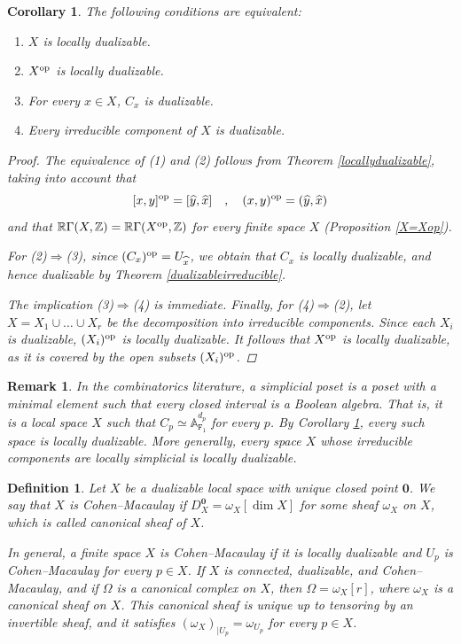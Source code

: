\documentclass[amssymb,amscd,11pt,20pt]{amsart}
\newcommand{\FF}{{\mathtt F}}
\newcommand{\ZZ}{{\mathbb Z}}
\newcommand{\RR}{\mathbb R}
\newcommand{\0}{\mathbf 0}
\newcommand{\wh}{\widehat}
\newcommand{\A}{{\mathbb A}}
\theoremstyle{plain}
\newtheorem{cor}[thm]{Corollary}
\newtheorem{defn}[thm]{Definition}
\newtheorem{rem}[thm]{Remark}
\numberwithin{equation}{thm}
\begin{document}
\begin{cor}\label{loc-dual-op} The following conditions are equivalent:
\begin{enumerate} \item $X$ is locally dualizable.
\item $X^{\rm op}$ is locally dualizable.
\item For every $x\in X$, $C_x$ is dualizable.
\item Every irreducible component of $X$ is dualizable.
\end{enumerate}

\begin{proof} The equivalence of (1) and (2) follows from Theorem \ref{locallydualizable}, taking into account that
\[ [x,y]^{\text{\rm op}}=[\wh y,\wh x]\quad , \quad (x,y)^{\text{\rm op}}=(\wh y,\wh x)\] and that $\RR\Gamma(X,\ZZ)=\RR\Gamma(X^{\text{\rm op}},\ZZ)$ for every finite space $X$ (Proposition \ref{X=Xop}).

For (2)$\Rightarrow $(3), since $(C_x)^{\text{\rm op}}=U_{\wh x}$, we obtain that $C_x$ is locally dualizable, and hence dualizable by Theorem \ref{dualizableirreducible}.

The implication (3)$\Rightarrow $(4)  is immediate.  Finally, for (4)$\Rightarrow $(2), let $X=X_1\cup\dots\cup X_r$ be the decomposition into irreducible components. Since each $X_i$ is dualizable, $(X_i)^{\text{\rm op}}$ is locally dualizable. It follows that  $X^{\text{\rm op}}$ is locally dualizable, as it is covered by the open subsets $(X_i)^{\text{\rm op}}$.
\end{proof}

\end{cor}

\begin{rem}{\rm In the combinatorics literature, a {\em simplicial poset} is a poset with a minimal element such that every closed interval is a Boolean algebra. That is, it is a local space $X$ such that $C_p\simeq \A^{d_p}_{\FF_1}$ for every $p$. By Corollary \ref{loc-dual-op}, every such space is locally dualizable. More generally, every space $X$ whose irreducible components are locally simplicial is locally dualizable.}
\end{rem}



\medskip
{}
\medskip

\begin{defn} {\rm Let $X$ be a dualizable local space with unique closed point   $\0$. We say that $X$ is {\em Cohen--Macaulay} if $D_X^{\0}=\omega_X[\dim X]$ for some sheaf $\omega_X$ on $X$, which is called {\em canonical sheaf} of $X$.

In general, a finite space $X$ is Cohen--Macaulay if it is locally dualizable and $U_p$ is Cohen--Macaulay for every $p\in X$. If $X$ is connected, dualizable, and  Cohen--Macaulay, and if $\Omega$ is a canonical complex on $X$, then $\Omega=\omega_X[r]$, where $\omega_X$ is  a canonical sheaf on $X$. This canonical sheaf  is unique up to tensoring by an invertible sheaf, and it satisfies  $(\omega_X)_{\vert U_p}=\omega_{U_p}$ for every $p\in X$.
}\end{defn}
\end{document}
